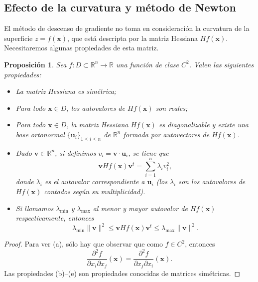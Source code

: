\documentclass[12pt, a4paper]{amsbook}
\newcommand{\R}{{\mathbb R}}
\newcommand{\uu}{{\mathbf u}}
\newcommand{\vv}{{\mathbf v}}
\newcommand{\xx}{{\mathbf x}}
\newtheorem{prop}[teo]{Proposici\'on}
\theoremstyle{remark}
\theoremstyle{definition}
\numberwithin{section}{chapter}
\numberwithin{subsection}{section}
\numberwithin{equation}{section}
\numberwithin{figure}{chapter}
\begin{document}
\subsection{Efecto de la curvatura y método de Newton}

El método de descenso de gradiente no toma en consideración la curvatura de la superficie $z=f(\xx)$, que está descripta por la matriz Hessiana $Hf(\xx)$.  Necesitaremos algunas propiedades de esta matriz.
\begin{prop}\label{prop.H}
Sea $f\colon D\subset\R^n\to \R$ una función de clase $C^2$. Valen las siguientes propiedades:
\begin{itemize}
\item[(a)] La matriz Hessiana es simétrica;
\item[(b)] Para todo $\xx\in D$, los autovalores de $Hf(\xx)$ son reales;
\item[(c)] Para todo $\xx\in D$, la matriz Hessiana $Hf(\xx)$ es diagonalizable y existe una base ortonormal $\{\uu_i\}_{1\le i\le n}$ de $\R^n$ formada por autovectores de $Hf(\xx)$.
\item[(d)] Dado $\vv\in\R^n$, si definimos $v_i = \vv\cdot\uu_i$, se tiene que
$$
\vv Hf(\xx)\vv^t = \sum_{i=1}^n \lambda_i v_i^2,
$$
donde $\lambda_i$ es el autovalor correspondiente a $\uu_i$ (los $\lambda_i$ son los autovalores de $Hf(\xx)$ contados según su multiplicidad).
\item[(e)] Si llamamos $\lambda_\text{min}$ y $\lambda_\text{max}$ al menor y mayor autovalor de $Hf(\xx)$ respectivamente, entonces
$$
\lambda_\text{min} \|\vv\|^2\le \vv Hf(\xx)\vv^t\le \lambda_\text{max} \|\vv\|^2.
$$
\end{itemize}
\end{prop}
\begin{proof}
Para ver (a), sólo hay que observar que como $f\in C^2$, entonces
$$
\frac{\partial^2 f}{\partial x_i\partial x_j}(\xx) = \frac{\partial^2 f}{\partial x_j\partial x_i}(\xx).
$$
Las propiedades (b)--(e) son propiedades conocidas de matrices simétricas.
\end{proof}
\end{document}

